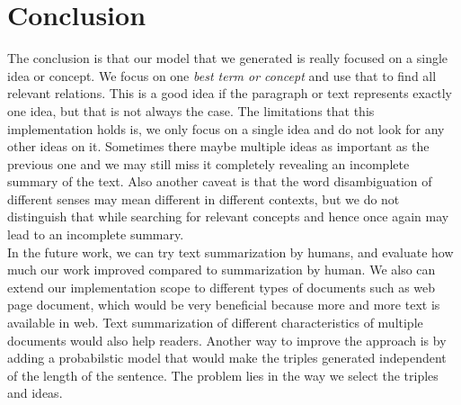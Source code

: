 \documentclass[conference]{IEEEtran}
\begin{document}
\section{Conclusion}
The conclusion is that our model that we generated is really focused on a single idea or concept. We focus on one \textit{best term or concept} and use that to find all relevant relations. This is a good idea if the paragraph or text represents exactly one idea, but that is not always the case. The limitations that this implementation holds is, we only focus on a single idea and do not look for any other ideas on it. Sometimes there maybe multiple ideas as important as the previous one and we may still miss it completely revealing an incomplete summary of the text. Also another caveat is that the word disambiguation of different senses may mean different in different contexts, but we do not distinguish that while searching for relevant concepts and hence once again may lead to an incomplete summary.\\
In the future work, we can try text summarization by humans, and evaluate how much our work improved compared to summarization by human. We also can extend our implementation scope to different types of documents such as web page document, which would be very beneficial because more and more text is available in web. Text summarization of different characteristics of multiple documents would also help readers. Another way to improve the approach is by adding a probabilstic model that would make the triples generated independent of the length of the sentence. The problem lies in the way we select the triples and ideas.
\end{document}
